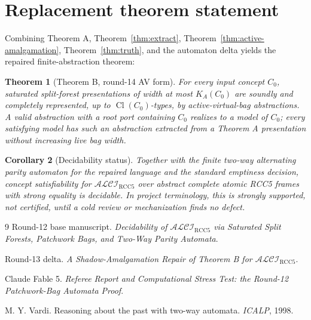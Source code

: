 \documentclass[11pt]{article}
\newtheorem{theorem}{Theorem}[section]
\newtheorem{corollary}[theorem]{Corollary}
\newcommand{\ALCIRCC}{\mathcal{ALCI}_{\mathrm{RCC5}}}
\newcommand{\Cl}{\operatorname{Cl}}
\begin{document}
\section{Replacement theorem statement}

Combining Theorem A, Theorem~\ref{thm:extract},
Theorem~\ref{thm:active-amalgamation}, Theorem~\ref{thm:truth}, and the
automaton delta yields the repaired finite-abstraction theorem:

\begin{theorem}[Theorem B, round-14 AV form]
For every input concept \(C_0\), saturated split-forest presentations of width
at most \(K_A(C_0)\) are soundly and completely represented, up to
\(\Cl(C_0)\)-types, by active-virtual-bag abstractions.  A valid abstraction
with a root port containing \(C_0\) realizes to a model of \(C_0\); every
satisfying model has such an abstraction extracted from a Theorem A
presentation without increasing live bag width.
\end{theorem}

\begin{corollary}[Decidability status]
Together with the finite two-way alternating parity automaton for the repaired
language and the standard emptiness decision, concept satisfiability for
\(\ALCIRCC\) over abstract complete atomic RCC5 frames with strong equality is
decidable.  In project terminology, this is strongly supported, not certified,
until a cold review or mechanization finds no defect.
\end{corollary}

\begin{thebibliography}{9}
 Round-12 base manuscript.  \emph{Decidability of
\(\mathcal{ALCI}_{\mathrm{RCC5}}\) via Saturated Split Forests, Patchwork Bags,
and Two-Way Parity Automata}.

 Round-13 delta.  \emph{A Shadow-Amalgamation Repair of
Theorem B for \(\mathcal{ALCI}_{\mathrm{RCC5}}\)}.

 Claude Fable 5.  \emph{Referee Report and Computational Stress
Test: the Round-12 Patchwork-Bag Automata Proof}.

 M. Y. Vardi.  Reasoning about the past with two-way automata.
\emph{ICALP}, 1998.
\end{thebibliography}
\end{document}

